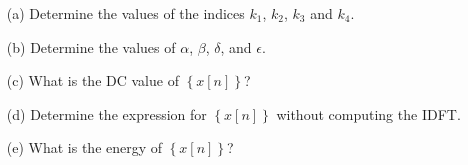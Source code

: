 \documentclass[a4paper,11pt,oneside]{article}
\begin{document}
\begin{itemize}
\item[(a)] Determine the values of the indices $k_1$, $k_2$, $k_3$ and $k_4$.
\item[(b)] Determine the values of $\alpha$, $\beta$, $\delta$, and $\epsilon$.
\item[(c)] What is the DC value of $\left\{x[n]\right\}$?
\item[(d)] Determine the expression for $\left\{x[n]\right\}$ without computing the IDFT.
\item[(e)] What is the energy of $\left\{x[n]\right\}$?
\end{itemize}
\end{document}
